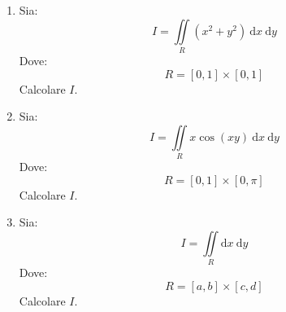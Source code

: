 \documentclass[a4paper]{article}
\begin{document}
	\begin{enumerate}
		\item Sia:
		\begin{equation*}
			I = \displaystyle\iint \limits_{R} \left(x^{2}+y^{2}\right) \:\mathrm{d}x \:\mathrm{d}y
		\end{equation*}
		Dove:
		\begin{equation*}
			R = \left[0,1\right] \times \left[0,1\right]
		\end{equation*}
		Calcolare $I$.
		
		\item Sia:
		\begin{equation*}
			I = \displaystyle\iint \limits_{R} x \cos\left(xy\right) \:\mathrm{d}x \:\mathrm{d}y
		\end{equation*}
		Dove:
		\begin{equation*}
			R = \left[0,1\right] \times \left[0,\pi\right]
		\end{equation*}
		Calcolare $I$.
		
		\item Sia:
		\begin{equation*}
			I = \displaystyle\iint \limits_{R} \mathrm{d}x \: \mathrm{d}y
		\end{equation*}
		Dove:
		\begin{equation*}
			R = \left[a,b\right] \times \left[c,d\right]
		\end{equation*}
		Calcolare $I$.
	\end{enumerate}
\end{document}
